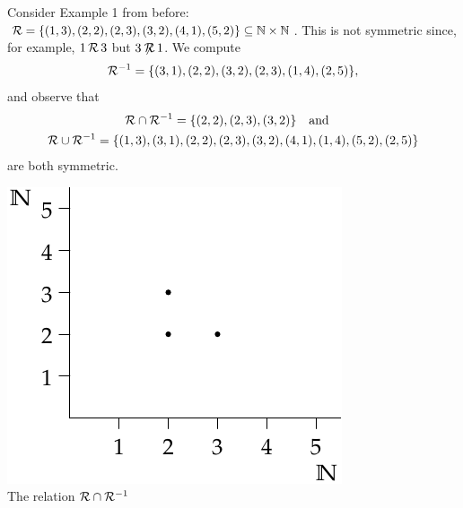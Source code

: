 \begin{example}{}{}
	Consider Example 1 from before: $\mathcal{R}=\{(1,3),(2,2),(2,3),(3,2),(4,1),(5,2)\}\subseteq\mathbb{N}\times\mathbb{N}$. This is not symmetric since, for example, $1\,\mathcal{R}\,3$ but $3\not\!\!\mathcal{R}\,1$. We compute
	\[
		\mathcal{R}^{-1}=\{(3,1),(2,2),(3,2),(2,3),(1,4),(2,5)\},
	\]
	and observe that
	\begin{gather*}
		\mathcal{R}\cap \mathcal{R}^{-1}=\{(2,2), (2,3), (3,2)\}\quad\text{and}\quad \\
		\mathcal{R}\cup \mathcal{R}^{-1}=\{(1,3),(3,1),(2,2),(2,3),(3,2),(4,1),(1,4),(5,2),(2,5)\}
	\end{gather*}
	are both symmetric.
\end{example}

\begin{center}
	\begin{minipage}{0.35\textwidth}\centering
		\includegraphics[width=\textwidth]{relations-03-relnint}\\
		The relation $\mathcal{R}\cap \mathcal{R}^{-1}$
	\end{minipage}
	\qquad\qquad\qquad
	\begin{minipage}{0.35\textwidth}\centering

\end{minipage}
\end{center}
